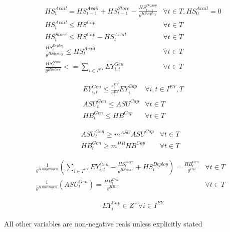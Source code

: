 \documentclass[12 pt]{article}
\begin{document}
\begin{align}
& HS^{Avail}_{t} = HS^{Avail}_{t-1} + HS^{Store}_{t-1} - \frac{HS^{Deploy}_{t-1}}{\theta^{HSdeploy}} & \forall t \in T,HS^{Avail}_{0} = 0 \\
& HS^{Avail}_{t} \leq HS^{Cap} & \forall t \in T \\
& HS^{Store}_{t} \leq HS^{Cap}-HS^{Avail}_{t} & \forall t \in T \\
&  \frac{HS^{Deploy}_{t}}{\theta^{HSdeploy}} \leq HS^{Avail}_{t} & \forall t \in T \\
& \frac{HS^{Store}_{t}}{\theta^{HSstore}} <= \sum_{i \in I^{EY}}EY^{Gen}_{i,t} & \forall t \in T
\end{align}

\begin{align}
& EY^{Gen}_{i,t} \leq \frac{s^{EY}_{i}}{e^{EY}_{i}}EY^{Cap}_{i} & \forall i,t \in I^{EY},T \\
& ASU^{Gen}_{t} \leq ASU^{Cap} & \forall t \in T \\
& HB^{Gen}_{t} \leq HB^{Cap} & \forall t \in T
\end{align}

\begin{align}
ASU^{Gen}_{t} \geq m^{ASU}ASU^{Cap} & \forall t \in T \\
HB^{Gen}_{t} \geq m^{HB}HB^{Cap} & \forall t \in T
\end{align}

\begin{align}
\frac{1}{\theta^{HBhydrogen}}(\sum_{i \in I^{EY}}EY^{Gen}_{i,t}-\frac{HS^{Store}_{t}}{\theta^{HSstore}} + HS^{Deploy}_{t}) = \frac{HB^{Gen}_{t}}{\theta^{HB}} & \forall t \in T \\
\frac{1}{\theta^{HBnitrogen}}(ASU^{Gen}_{t}) = \frac{HB^{Gen}_{t}}{\theta^{HB}} & \forall t \in T
\end{align}

\begin{align}
& EY^{Cap}_{i} \in Z^{+} \forall i \in I^{EY}
\end{align}

All other variables are non-negative reals unless explicitly stated
\end{document}
